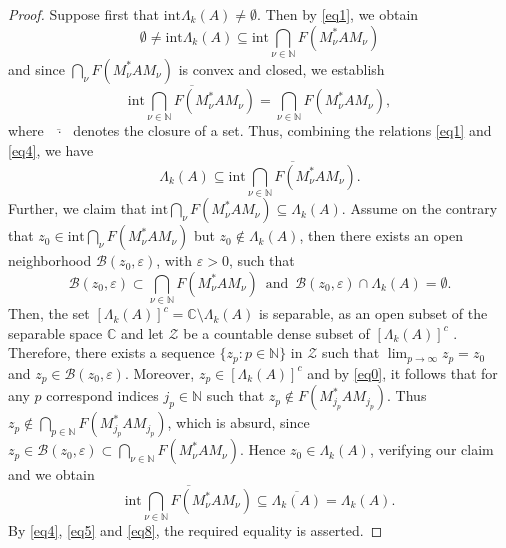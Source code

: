 \documentclass[12pt, reqno]{amsart}
\theoremstyle{definition}
\theoremstyle{remark}
\numberwithin{equation}{section}
\begin{document}
\begin{proof}
Suppose first that $\mathrm{int}\Lambda_{k}(A)\neq\emptyset$. Then by \eqref{eq1}, we obtain
\[
\emptyset\neq \mathrm{int}\Lambda_{k}(A)\subseteq \mathrm{int}\bigcap_{\nu\in\mathbb{N}}F(M_{\nu}^{*}AM_{\nu})
\]
and since $\bigcap_{\nu}F(M_{\nu}^{*}AM_{\nu})$ is convex and closed, we establish
\begin{equation}\label{eq4}
\overline{\mathrm{int}\bigcap_{\nu\in\mathbb{N}}F(M_{\nu}^{*}AM_{\nu})}=\bigcap_{\nu\in\mathbb{N}}F(M_{\nu}^{*}AM_{\nu}),
\end{equation}
where $\overline{\,\,\,\cdot\,\,}$ denotes the closure of a set. Thus, combining the relations \eqref{eq1} and \eqref{eq4}, we have
\begin{equation}\label{eq5}
\Lambda_{k}(A)\subseteq\overline{\mathrm{int}\bigcap_{\nu\in\mathbb{N}}F(M_{\nu}^{*}AM_{\nu})}.
\end{equation}
Further, we claim that $\mathrm{int}\bigcap_{\nu}F(M_{\nu}^{*}AM_{\nu})\subseteq\Lambda_{k}(A)$. Assume on the contrary that $z_{0}\in \mathrm{int}\bigcap_{\nu}F(M_{\nu}^{*}AM_{\nu})$ but $z_{0}\notin\Lambda_{k}(A)$, then there exists an open neighborhood
$\mathcal{B}(z_{0},\varepsilon)$, with $\varepsilon >0$, such that
\begin{equation*}
\mathcal{B}(z_{0},\varepsilon)\subset\bigcap_{\nu\in\mathbb{N}}F(M_{\nu}^{*}AM_{\nu})\,\,\,\textrm{and}\,\,\,
\mathcal{B}(z_{0},\varepsilon)\cap\Lambda_{k}(A)=\emptyset.
\end{equation*}
Then, the set $[\Lambda_{k}(A)]^{c}=\mathbb{C}\setminus\Lambda_{k}(A)$ is separable, as an open  subset of the sepa\-rable space $\mathbb{C}$ and let $\mathcal{Z}$ be a countable dense subset of $[\Lambda_{k}(A)]^{c}$ \cite{top}.
Therefore, there exists a sequence $\{z_{p}:p\in\mathbb{N}\}$ in $\mathcal{Z}$ such that
$\lim_{p\to\infty}z_{p}=z_{0}$ and $z_{p}\in\mathcal{B}(z_{0},\varepsilon)$. Moreover, $z_{p}\in[\Lambda_{k}(A)]^{c}$ and by \eqref{eq0}, it follows that for any $p$ correspond indices $j_{p}\in\mathbb{N}$ such that $z_{p}\notin F(M_{j_{p}}^{*}AM_{j_{p}})$. Thus $z_{p}\notin\bigcap_{p\in\mathbb{N}}F(M_{j_{p}}^{*}AM_{j_{p}})$, which is absurd, since $z_{p}\in\mathcal{B}(z_{0},\varepsilon)\subset\bigcap_{\nu\in\mathbb{N}}F(M_{\nu}^{*}AM_{\nu})$. Hence $z_{0}\in\Lambda_{k}(A)$,
verifying our claim and we obtain
\begin{equation}\label{eq8}
\overline{\mathrm{int}\bigcap_{\nu\in\mathbb{N}}F(M_{\nu}^{*}AM_{\nu})}\subseteq\overline{\Lambda_{k}(A)}=\Lambda_{k}(A).
\end{equation}
By \eqref{eq4}, \eqref{eq5} and \eqref{eq8}, the required equality is asserted.


\end{proof}
\end{document}
